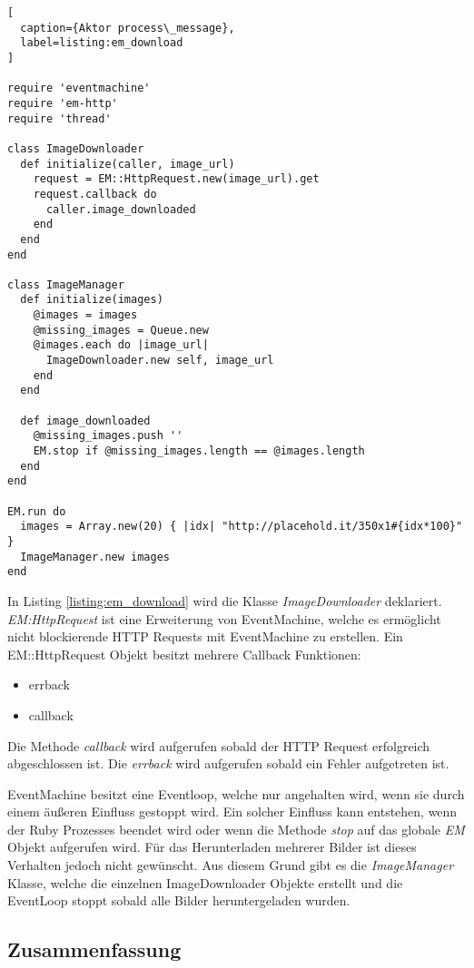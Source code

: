 \begin{lstlisting}[
  caption={Aktor process\_message},
  label=listing:em_download
]

require 'eventmachine'
require 'em-http'
require 'thread'

class ImageDownloader
  def initialize(caller, image_url)
    request = EM::HttpRequest.new(image_url).get
    request.callback do
      caller.image_downloaded
    end
  end
end

class ImageManager
  def initialize(images)
    @images = images
    @missing_images = Queue.new
    @images.each do |image_url|
      ImageDownloader.new self, image_url
    end
  end

  def image_downloaded
    @missing_images.push ''
    EM.stop if @missing_images.length == @images.length
  end
end

EM.run do
  images = Array.new(20) { |idx| "http://placehold.it/350x1#{idx*100}" }
  ImageManager.new images
end
\end{lstlisting}

In Listing \ref{listing:em_download} wird die Klasse \emph{ImageDownloader} deklariert. \emph{EM:HttpRequest} ist eine Erweiterung von EventMachine, welche es ermöglicht nicht blockierende HTTP Requests mit EventMachine zu erstellen. Ein EM::HttpRequest Objekt besitzt mehrere Callback Funktionen:

\begin{itemize}
  \item errback
  \item callback
\end{itemize}

Die Methode \emph{callback} wird aufgerufen sobald der HTTP Request erfolgreich abgeschlossen ist. Die \emph{errback} wird aufgerufen sobald ein Fehler aufgetreten ist.

EventMachine besitzt eine Eventloop, welche nur angehalten wird, wenn sie durch einem äußeren Einfluss gestoppt wird. Ein solcher Einfluss kann entstehen, wenn der Ruby Prozesses beendet wird oder wenn die Methode \emph{stop} auf das globale \emph{EM} Objekt aufgerufen wird. Für das Herunterladen mehrerer Bilder ist dieses Verhalten jedoch nicht gewünscht. Aus diesem Grund gibt es die \emph{ImageManager} Klasse, welche die einzelnen ImageDownloader Objekte erstellt und die EventLoop stoppt sobald alle Bilder heruntergeladen wurden. 

\subsection{Zusammenfassung}

